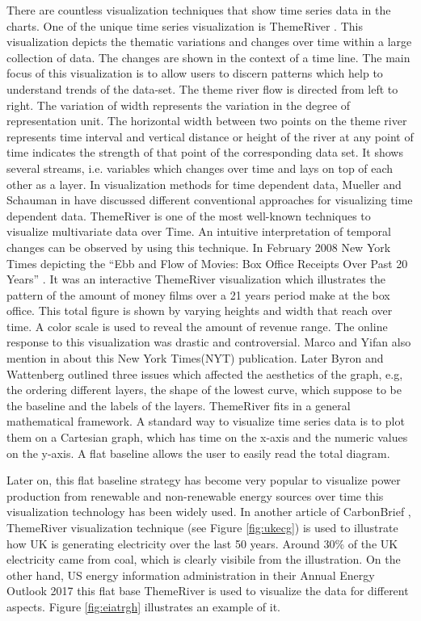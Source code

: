 There are countless visualization techniques that show time series data in the charts. One of the unique time series visualization is ThemeRiver \cite{981848}. This visualization depicts the thematic variations and changes over time within a large collection of data. The changes are shown in the context of a time line. The main focus of this visualization is to allow users to discern patterns which help to understand trends of the data-set. The theme river flow is directed from left to right. The variation of width represents the variation in the degree of representation unit. The horizontal width between two points on the theme river represents time interval and vertical distance or height of the river at any point of time indicates the strength of that point of the corresponding data set. It shows several streams, i.e. variables which changes over time and lays on top of each other as a layer. In visualization methods for time dependent data, Mueller and Schauman in \cite{1261490} have discussed different conventional approaches for visualizing time dependent data. ThemeRiver is one of the most well-known techniques to visualize multivariate data over Time. An intuitive interpretation of temporal changes can be observed by using this technique. In February 2008 New York Times depicting the “Ebb and Flow of Movies: Box Office Receipts Over Past 20 Years” \cite{boxoffice}. It was an interactive ThemeRiver visualization which illustrates the pattern of the amount of money films over a 21 years period make at the box office. This total figure is shown by varying heights and width that reach over time. A color scale is used to reveal the amount of revenue range. The online response to this visualization was drastic and controversial. Marco and Yifan also mention in \cite{CGF12910} about this New York Times(NYT) publication. Later Byron and Wattenberg \cite{Byron2008} outlined three issues which affected the aesthetics of the graph, e.g, the ordering different layers, the shape of the lowest curve, which suppose to be the baseline and the labels of the layers. ThemeRiver fits in a general mathematical framework. A standard way to visualize time series data is to plot them on a Cartesian graph, which has time on the x-axis and the numeric values on the y-axis. A flat baseline allows the user to easily read the total diagram. 

Later on, this flat baseline strategy has become very popular to visualize power production from renewable and non-renewable energy sources over time this visualization technology has been widely used. In another article of CarbonBrief \cite{cbuk2016}, ThemeRiver visualization technique (see Figure \ref{fig:ukecg}) is used to illustrate how UK is generating electricity over the last 50 years. Around 30\% of the UK electricity came from coal, which is clearly visibile from the illustration. On the other hand, US energy information administration in their Annual Energy Outlook 2017 \cite{eiagov} this flat base ThemeRiver is used to visualize the data for different aspects. Figure \ref{fig:eiatrgh} illustrates an example of it. 

